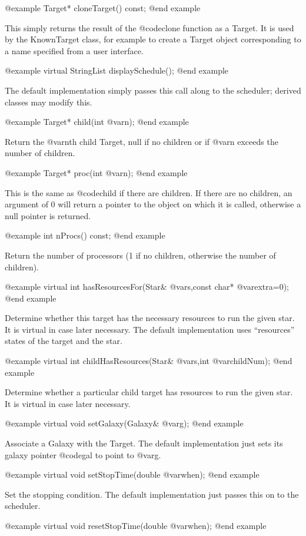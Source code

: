 @example
Target* cloneTarget() const;
@end example

This simply returns the result of the @code{clone} function as a Target.
It is used by the KnownTarget class, for example to create a Target
object corresponding to a name specified from a user interface.

@example
virtual StringList displaySchedule();
@end example

The default implementation simply passes this call along to the
scheduler; derived classes may modify this.

@example
Target* child(int @var{n});
@end example

Return the @var{n}th child Target, null if no children or if
@var{n} exceeds the number of children.

@example
Target* proc(int @var{n});
@end example

This is the same as @code{child} if there are children.  If
there are no children, an argument of 0 will return a pointer
to the object on which it is called, otherwise a null pointer
is returned.

@example
int nProcs() const;
@end example

Return the number of processors (1 if no children, otherwise the
number of children).

@example
virtual int hasResourcesFor(Star& @var{s},const char* @var{extra}=0);
@end example

Determine whether this target has the necessary resources to run the
given star.  It is virtual in case later necessary.  The default implementation
uses ``resources'' states of the target and the star.

@example
virtual int childHasResources(Star& @var{s},int @var{childNum});
@end example

Determine whether a particular child target has resources
to run the given star.  It is virtual in case later necessary.

@example
virtual void setGalaxy(Galaxy& @var{g});
@end example

Associate a Galaxy with the Target.  The default implementation
just sets its galaxy pointer @code{gal} to point to @var{g}.

@example
virtual void setStopTime(double @var{when});
@end example

Set the stopping condition.  The default implementation just passes
this on to the scheduler.

@example
virtual void resetStopTime(double @var{when});
@end example

